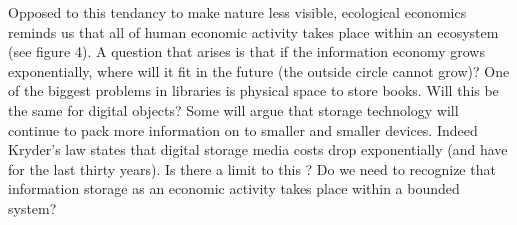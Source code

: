 Opposed to this tendancy to make nature less visible, ecological economics reminds us that all of human economic activity takes place within an ecosystem (see figure 4).  A question that arises is that if the information economy grows exponentially, where will it fit in the future (the outside circle cannot grow)? One of the biggest problems in libraries is physical space to store books. Will this be the same for digital objects? Some will argue that storage technology will continue to pack more information on to smaller and smaller devices. Indeed Kryder's law states that digital storage media costs drop exponentially (and have for the last thirty years). Is there a limit to this \citep[cf.][]{rosenthal_2012}? Do we need to recognize that information storage as an economic activity takes place within a bounded system?